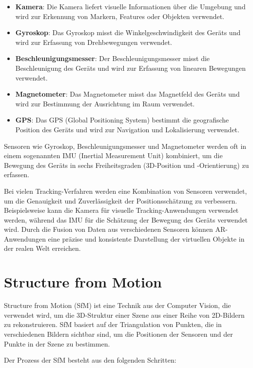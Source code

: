 \begin{itemize}
    \item \textbf{Kamera}: Die Kamera liefert visuelle Informationen über die Umgebung und wird zur Erkennung von Markern, Features oder Objekten verwendet.
    \item \textbf{Gyroskop}: Das Gyroskop misst die Winkelgeschwindigkeit des Geräts und wird zur Erfassung von Drehbewegungen verwendet.
    \item \textbf{Beschleunigungsmesser}: Der Beschleunigungsmesser misst die Beschleunigung des Geräts und wird zur Erfassung von linearen Bewegungen verwendet.
    \item \textbf{Magnetometer}: Das Magnetometer misst das Magnetfeld des Geräts und wird zur Bestimmung der Ausrichtung im Raum verwendet.
    \item \textbf{GPS}: Das GPS (Global Positioning System) bestimmt die geografische Position des Geräts und wird zur Navigation und Lokalisierung verwendet.
\end{itemize}

Sensoren wie Gyroskop, Beschleunigungsmesser und Magnetometer werden oft in einem sogenannten IMU (Inertial Measurement Unit) kombiniert, um die Bewegung des Geräts in sechs Freiheitsgraden (3D-Position und -Orientierung) zu erfassen. 

Bei vielen Tracking-Verfahren werden eine Kombination von Sensoren verwendet, um die Genauigkeit und Zuverlässigkeit der Positionsschätzung zu verbessern. Beispielsweise kann die Kamera für visuelle Tracking-Anwendungen verwendet werden, während das IMU für die Schätzung der Bewegung des Geräts verwendet wird. Durch die Fusion von Daten aus verschiedenen Sensoren können AR-Anwendungen eine präzise und konsistente Darstellung der virtuellen Objekte in der realen Welt erreichen.

\section{Structure from Motion}

Structure from Motion (SfM) ist eine Technik aus der Computer Vision, die verwendet wird, um die 3D-Struktur einer Szene aus einer Reihe von 2D-Bildern zu rekonstruieren. SfM basiert auf der Triangulation von Punkten, die in verschiedenen Bildern sichtbar sind, um die Positionen der Sensoren und der Punkte in der Szene zu bestimmen.

Der Prozess der SfM besteht aus den folgenden Schritten: 

